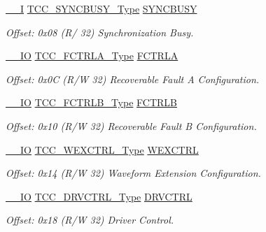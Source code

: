 \begin{DoxyCompactItemize}
\mbox{\hyperlink{core__cm0plus_8h_af63697ed9952cc71e1225efe205f6cd3}{\+\_\+\+\_\+I}} \mbox{\hyperlink{union_t_c_c___s_y_n_c_b_u_s_y___type}{T\+C\+C\+\_\+\+S\+Y\+N\+C\+B\+U\+S\+Y\+\_\+\+Type}} \mbox{\hyperlink{struct_tcc_ae9b6701602427f3812cbe1b13c368235}{S\+Y\+N\+C\+B\+U\+SY}}
\begin{DoxyCompactList}\small\item\em Offset\+: 0x08 (R/ 32) Synchronization Busy. \end{DoxyCompactList}\item 
\mbox{\hyperlink{core__cm0plus_8h_aec43007d9998a0a0e01faede4133d6be}{\+\_\+\+\_\+\+IO}} \mbox{\hyperlink{union_t_c_c___f_c_t_r_l_a___type}{T\+C\+C\+\_\+\+F\+C\+T\+R\+L\+A\+\_\+\+Type}} \mbox{\hyperlink{struct_tcc_a03e99b5d80cc8c4507ace1e2c4234adf}{F\+C\+T\+R\+LA}}
\begin{DoxyCompactList}\small\item\em Offset\+: 0x0C (R/W 32) Recoverable Fault A Configuration. \end{DoxyCompactList}\item 
\mbox{\hyperlink{core__cm0plus_8h_aec43007d9998a0a0e01faede4133d6be}{\+\_\+\+\_\+\+IO}} \mbox{\hyperlink{union_t_c_c___f_c_t_r_l_b___type}{T\+C\+C\+\_\+\+F\+C\+T\+R\+L\+B\+\_\+\+Type}} \mbox{\hyperlink{struct_tcc_a46b880c5a28c3b17c20fc1d76ce2b093}{F\+C\+T\+R\+LB}}
\begin{DoxyCompactList}\small\item\em Offset\+: 0x10 (R/W 32) Recoverable Fault B Configuration. \end{DoxyCompactList}\item 
\mbox{\hyperlink{core__cm0plus_8h_aec43007d9998a0a0e01faede4133d6be}{\+\_\+\+\_\+\+IO}} \mbox{\hyperlink{union_t_c_c___w_e_x_c_t_r_l___type}{T\+C\+C\+\_\+\+W\+E\+X\+C\+T\+R\+L\+\_\+\+Type}} \mbox{\hyperlink{struct_tcc_aad33ead9530dfb9aeac8b4dee64007cd}{W\+E\+X\+C\+T\+RL}}
\begin{DoxyCompactList}\small\item\em Offset\+: 0x14 (R/W 32) Waveform Extension Configuration. \end{DoxyCompactList}\item 
\mbox{\hyperlink{core__cm0plus_8h_aec43007d9998a0a0e01faede4133d6be}{\+\_\+\+\_\+\+IO}} \mbox{\hyperlink{union_t_c_c___d_r_v_c_t_r_l___type}{T\+C\+C\+\_\+\+D\+R\+V\+C\+T\+R\+L\+\_\+\+Type}} \mbox{\hyperlink{struct_tcc_a1e68869c006eabb53d7259494b255c4d}{D\+R\+V\+C\+T\+RL}}
\begin{DoxyCompactList}\small\item\em Offset\+: 0x18 (R/W 32) Driver Control. \end{DoxyCompactList}\item 

\end{DoxyCompactItemize}
